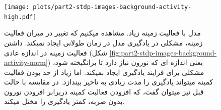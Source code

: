         \begin{figure}[H]
            \centering
            \texttt{[image: plots/part2-stdp-images-background-activity-high.pdf]}
            \caption{مدل با فعالیت زمینه زیاد.
            مشاهده میکنیم که تغییر در میزان فعالیت زمینه، مشکلی در یادگیری مدل در زمان طولانی ایجاد نمیکند. داشتن فعالیت زمینه در اندازه عادی
            (شکل \ref{fig:part2-stdp-images-background-activity-norm})
            یعنی اندازه ای که نورون نیاز دارد تا برانگیخته شود، مشکلی برای فرایند یادگیری ایجاد نمیکند. اما زیاد از حد بودن فعالیت کمینه میتواند یادگیری را مدت زیادی به تاخیر بیندازد. در مقایسه با حالت قبل نیز میتوان گفت، که افزودن فعالیت کمینه دربرابر افزودن نورون بدون ضربه، کمتر یادگیری را مختل میکند.
            }
            \label{fig:part2-stdp-images-background-activity-high}
        \end{figure}
